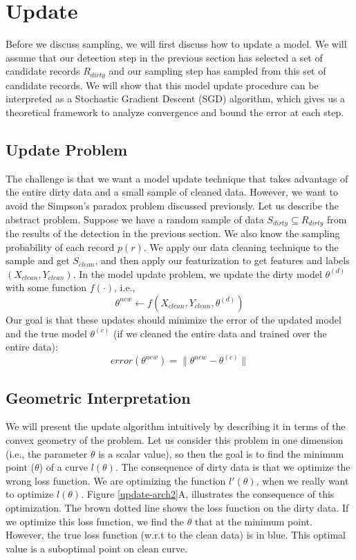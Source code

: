 \section{Update}\label{model-update}
Before we discuss sampling, we will first discuss how to update a model.
We will assume that our detection step in the previous section has selected 
a set of candidate records $R_{dirty}$ and our sampling step has sampled from this
set of candidate records.
We will show that this model update procedure can be interpreted as a Stochastic 
Gradient Descent (SGD) algorithm, which gives us a theoretical framework to analyze
convergence and bound the error at each step.

\subsection{Update Problem}
The challenge is that we want a model update technique that takes advantage of the entire dirty data and a small sample of cleaned data.
However, we want to avoid the Simpson's paradox problem discussed previously.
Let us describe the abstract problem.
Suppose we have a random sample of data $S_{dirty} \subseteq R_{dirty}$ from the results of the detection in the previous section.
We also know the sampling probability of each record $p(r)$.
We apply our data cleaning technique to the sample and get $S_{clean}$, and then apply our featurization to get features and labels $(X_{clean},Y_{clean})$. 
In the model update problem, we update the dirty model $\theta^{(d)}$ with some function $f(\cdot)$, i.e.,
\[
\theta^{new} \leftarrow f(X_{clean},Y_{clean},\theta^{(d)})
\]
Our goal is that these updates should minimize the error of the updated model and the true model $\theta^{(c)}$ (if we cleaned the entire data and trained over the entire data):
\[
error(\theta^{new}) = \| \theta^{new} - \theta^{(c)} \|
\]

\subsection{Geometric Interpretation}
We will present the update algorithm intuitively by describing it in terms of the convex geometry of the problem.
Let us consider this problem in one dimension (i.e., the parameter $\theta$ is a scalar value), so then the goal is to find the minimum point ($\theta$) of a curve $l(\theta)$.
The consequence of dirty data is that we optimize the wrong loss function.
We are optimizing the function $l'(\theta)$, when we really want to optimize $l(\theta)$.
Figure \ref{update-arch2}A, illustrates the consequence of this optimization.
The brown dotted line shows the loss function on the dirty data.
If we optimize this loss function, we find the $\theta$ that at the minimum point.
However, the true loss function (w.r.t to the clean data) is in blue.
This optimal value is a suboptimal point on clean curve.

